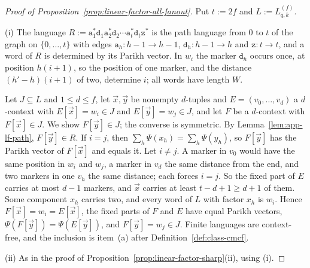 \documentclass[11pt]{article}
\numberwithin{equation}{section}
\theoremstyle{plain}
\theoremstyle{definition}
\theoremstyle{remark}
\newcommand{\tuple}[1]{\vec{#1}}
\begin{document}
\begin{proof}[Proof of Proposition~\ref{prop:linear-factor-all-fanout}]
Put $t:=2f$ and $L:=L^{(f)}_{q,k}$.

(i) The language $R:=\mathtt a_1^*\mathtt d_1\mathtt a_2^*\mathtt d_2\cdots
\mathtt a_t^*\mathtt d_t\mathtt z^*$ is the path language from $0$ to $t$ of the graph
on $\{0,\ldots,t\}$ with edges $\mathtt a_h:h-1\to h-1$, $\mathtt d_h:h-1\to h$ and
$\mathtt z:t\to t$, and a word of $R$ is determined by its Parikh vector.  In
$w_i$ the marker $\mathtt d_h$ occurs once, at position $h(i+1)$, so the position
of one marker, and the distance $(h'-h)(i+1)$ of two, determine $i$; all words
have length $W$.

Let $J\subseteq L$ and $1\le d\le f$, let $\tuple x,\tuple y$ be nonempty
$d$-tuples and $E=(v_0,\ldots,v_d)$ a $d$-context with $E[\tuple x]=w_i\in J$ and
$E[\tuple y]=w_j\in J$, and let $F$ be a $d$-context with $F[\tuple x]\in J$.  We
show $F[\tuple y]\in J$; the converse is symmetric.  By
Lemma~\ref{lem:app-lf-path}, $F[\tuple y]\in R$.  If $i=j$, then
$\sum_h\Psi(x_h)=\sum_h\Psi(y_h)$, so $F[\tuple y]$ has the Parikh vector of
$F[\tuple x]$ and equals it.  Let $i\ne j$.  A marker in $v_0$ would have the same
position in $w_i$ and $w_j$, a marker in $v_d$ the same distance from the end,
and two markers in one $v_h$ the same distance; each forces $i=j$.  So the fixed
part of $E$ carries at most $d-1$ markers, and $\tuple x$ carries at least
$t-d+1\ge d+1$ of them.  Some component $x_h$ carries two, and every word of $L$
with factor $x_h$ is $w_i$.  Hence $F[\tuple x]=w_i=E[\tuple x]$, the fixed parts
of $F$ and $E$ have equal Parikh vectors, $\Psi(F[\tuple y])=\Psi(E[\tuple y])$, and
$F[\tuple y]=w_j\in J$.  Finite languages are context-free, and the inclusion is
item~(a) after Definition~\ref{def:class-cmcf}.

(ii) As in the proof of Proposition~\ref{prop:linear-factor-sharp}(ii), using (i).


\end{proof}
\end{document}

